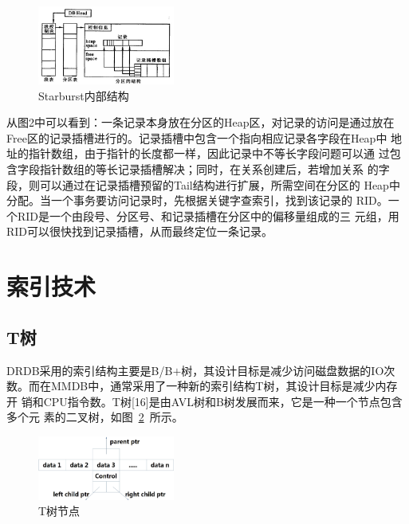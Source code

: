 \documentclass[literaturereview]{zjutreport}
\begin{document}
\begin{figure}[htbp]
\centering
\includegraphics[width=0.4\textwidth]{starburst}
\caption{Starburst内部结构}\label{fig:starburst}
\vspace{\baselineskip}
\end{figure}

从图2中可以看到：一条记录本身放在分区的Heap区，对记录的访问是通过放在
Free区的记录插槽进行的。记录插槽中包含一个指向相应记录各字段在Heap中
地址的指针数组，由于指针的长度都一样，因此记录中不等长字段问题可以通
过包含字段指针数组的等长记录插槽解决；同时，在关系创建后，若增加关系
的字段，则可以通过在记录插槽预留的Tail结构进行扩展，所需空间在分区的
Heap中分配。当一个事务要访问记录时，先根据关键字查索引，找到该记录的
RID。一个RID是一个由段号、分区号、和记录插槽在分区中的偏移量组成的三
元组，用RID可以很快找到记录插槽，从而最终定位一条记录。

\section{索引技术}
\subsection{T树}
DRDB采用的索引结构主要是B/B$+$树，其设计目标是减少访问磁盘数据的IO次
数。而在MMDB中，通常采用了一种新的索引结构T树，其设计目标是减少内存开
销和CPU指令数。T树[16]是由AVL树和B树发展而来，它是一种一个节点包含多个元
素的二叉树，如图~\ref{fig:treenode}~所示。

\begin{figure}[htbp]
\centering
\includegraphics[width=0.4\textwidth]{treenode}
\caption{T树节点}\label{fig:treenode}
\vspace{\baselineskip}
\end{figure}
\end{document}
